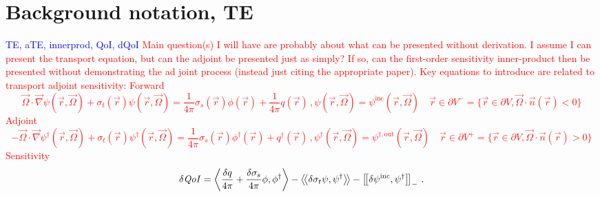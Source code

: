 \documentclass[review]{elsarticle}
\newcommand{\vr}{\vec{r}}
\newcommand{\vO}{\vec{\Omega}}
\newcommand{\bra}{\left\langle}
\newcommand{\ket}{\right\rangle}
\newcommand{\braSN}{\left\langle \! \left\langle}
\newcommand{\ketSN}{\right\rangle \! \right\rangle}
\newcommand{\sbraSN}{\left[ \! \left[}
\newcommand{\sketSN}{\right] \! \right]}
\newcommand{\grad}{\vec{\nabla}}
\newcommand{\sigt}{\sigma_t}
\newcommand{\sigs}{\sigma_s}
\newcommand{\angSourced}{\frac{\delta q}{4 \pi}}
\newcommand{\qoi}{{\it QoI}\xspace}
\newcommand{\comment}[2]{\marginpar{\textcolor{#2}{$\star$}}\textcolor{#2}{#1}\newline}
\newcommand{\iwh}[1]{\comment{#1}{red}}
\newcommand{\iwh}[1]{\phantom{a}}
\newcommand{\tcb}[1]{\textcolor{blue}{#1}}
\begin{document}
\section{Background notation, TE}
\tcb{TE, aTE, innerprod, QoI, dQoI}
\iwh{
Main question(s) I will have are probably about what can be presented without derivation. I assume I can present the transport equation, but can the adjoint be presented just as simply? If so, can the first-order sensitivity inner-product then be presented without demonstrating the ad joint process (instead just citing the appropriate paper). Key equations to introduce are related to transport adjoint sensitivity:
Forward
\begin{subequations}\label{eqs:TransportSystem}
\begin{equation}
\label{SS1GTE}
\vO \cdot \grad \psi(\vr,\vO) + \sigt(\vr) \psi(\vr,\vO) = \frac{1}{4 \pi} \sigs(\vr) \phi(\vr) + \frac{1}{4 \pi} q(\vr)\, ,
\end{equation}
\begin{equation}
\label{SS1GTE_bc}
\psi(\vr,\vO) = \psi^{\text{inc}}(\vr,\vO) \quad \vr \in \partial V^{-} = \{ \vr \in \partial V,  \vO \cdot \vec{n}(\vr) < 0\}
\end{equation}
\end{subequations}
Adjoint
\begin{subequations}\label{eqs:TransportAdjSystem}
\begin{equation}
\label{SS1GTE}
- \vO \cdot \grad \psi^\dag(\vr,\vO) + \sigt(\vr) \psi^\dag(\vr,\vO) = \frac{1}{4 \pi} \sigs(\vr) \phi^\dag(\vr) + q^\dag(\vr)\, ,
\end{equation}
\begin{equation}
\label{SS1GTE_bc}
\psi^\dag(\vr,\vO) = \psi^{\dag,\text{out}}(\vr,\vO) \quad \vr \in \partial V^{+} = \{ \vr \in \partial V,  \vO \cdot \vec{n}(\vr) > 0\}
\end{equation}
\end{subequations}
Sensitivity
\begin{equation}
\delta \qoi = \bra \angSourced  + \frac{\delta\sigs}{4 \pi} \phi , \phi^\dag  \ket - \braSN  \delta \sigt \psi , \psi^\dag \ketSN - \sbraSN \delta \psi^{\text{inc}}, \psi^\dag \sketSN_- \,.
\end{equation}
}

\end{document}
